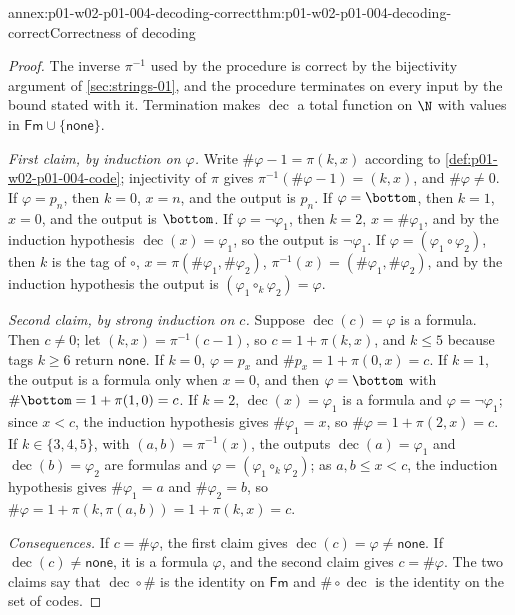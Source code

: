 \begin{annexitem}{annex:p01-w02-p01-004-decoding-correct}{thm:p01-w02-p01-004-decoding-correct}{Correctness of decoding}
\begin{proof}
The inverse \(\pi^{-1}\) used by the procedure is correct by the bijectivity
argument of \cref{sec:strings-01}, and the procedure terminates on every input
by the bound stated with it. Termination makes
\(\operatorname{dec}\) a total function on \(\N\) with values in
\(\mathsf{Fm}\cup\{\mathsf{none}\}\).

\emph{First claim, by induction on \(\varphi\).} Write
\(\#\varphi-1=\pi(k,x)\) according to \cref{def:p01-w02-p01-004-code};
injectivity of \(\pi\) gives \(\pi^{-1}(\#\varphi-1)=(k,x)\), and
\(\#\varphi\ne0\). If \(\varphi=p_n\), then \(k=0\), \(x=n\), and the output is
\(p_n\). If \(\varphi=\bottom\), then \(k=1\), \(x=0\), and the output is
\(\bottom\). If \(\varphi=\neg\varphi_1\), then \(k=2\), \(x=\#\varphi_1\), and
by the induction hypothesis \(\operatorname{dec}(x)=\varphi_1\), so the
output is \(\neg\varphi_1\). If \(\varphi=(\varphi_1\circ\varphi_2)\), then
\(k\) is the tag of \(\circ\), \(x=\pi(\#\varphi_1,\#\varphi_2)\),
\(\pi^{-1}(x)=(\#\varphi_1,\#\varphi_2)\), and by the induction hypothesis the
output is \((\varphi_1\circ_k\varphi_2)=\varphi\).

\emph{Second claim, by strong induction on \(c\).} Suppose
\(\operatorname{dec}(c)=\varphi\) is a formula. Then \(c\ne0\); let
\((k,x)=\pi^{-1}(c-1)\), so \(c=1+\pi(k,x)\), and \(k\le5\) because tags
\(k\ge6\) return \(\mathsf{none}\). If \(k=0\), \(\varphi=p_x\) and
\(\#p_x=1+\pi(0,x)=c\). If \(k=1\), the output is a formula only when \(x=0\),
and then \(\varphi=\bottom\) with \(\#\bottom=1+\pi(1,0)=c\). If \(k=2\),
\(\operatorname{dec}(x)=\varphi_1\) is a formula and \(\varphi=\neg\varphi_1\);
since \(x<c\), the induction hypothesis gives \(\#\varphi_1=x\), so
\(\#\varphi=1+\pi(2,x)=c\). If \(k\in\{3,4,5\}\), with \((a,b)=\pi^{-1}(x)\),
the outputs \(\operatorname{dec}(a)=\varphi_1\) and
\(\operatorname{dec}(b)=\varphi_2\) are formulas and
\(\varphi=(\varphi_1\circ_k\varphi_2)\); as \(a,b\le x<c\), the induction
hypothesis gives \(\#\varphi_1=a\) and \(\#\varphi_2=b\), so
\(\#\varphi=1+\pi(k,\pi(a,b))=1+\pi(k,x)=c\).

\emph{Consequences.} If \(c=\#\varphi\), the first claim gives
\(\operatorname{dec}(c)=\varphi\ne\mathsf{none}\). If
\(\operatorname{dec}(c)\ne\mathsf{none}\), it is a formula \(\varphi\), and the
second claim gives \(c=\#\varphi\). The two claims say that
\(\operatorname{dec}\circ\#\) is the identity on \(\mathsf{Fm}\) and
\(\#\circ\operatorname{dec}\) is the identity on the set of codes.
\end{proof}
\end{annexitem}


